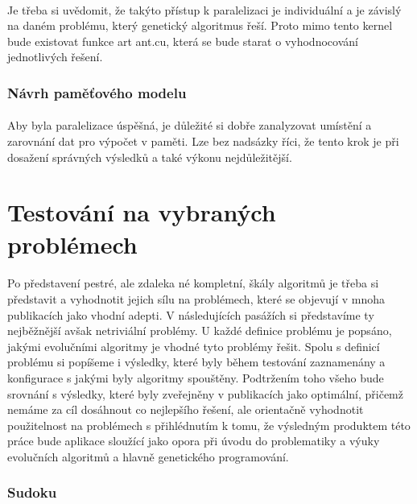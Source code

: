 \documentclass[bc,male,java,dept460]{diploma}		%
\begin{document}
\paragraph*{}
Je třeba si uvědomit, že takýto přístup k paralelizaci je individuální a je závislý na daném problému, který genetický algoritmus řeší. Proto mimo tento kernel bude existovat funkce art ant.cu, která se bude starat o vyhodnocování jednotlivých řešení.

\subsubsection{Návrh paměťového modelu}
\paragraph*{}
Aby byla paralelizace úspěšná, je důležité si dobře zanalyzovat umístění a zarovnání dat pro výpočet v paměti. Lze bez nadsázky říci, že tento krok je při dosažení správných výsledků a také výkonu nejdůležitější.



\section{Testování na vybraných problémech}
\paragraph*{}
Po představení pestré, ale zdaleka né kompletní, škály algoritmů je třeba si představit a vyhodnotit jejich sílu na problémech, které se objevují v mnoha publikacích jako vhodní adepti. V následujících pasážích si představíme ty nejběžnější avšak netriviální problémy. U každé definice problému je popsáno, jakými evolučními algoritmy je vhodné tyto problémy řešit. Spolu s definicí problému si popíšeme i výsledky, které byly během testování zaznamenány a konfigurace s jakými byly algoritmy spouštěny. Podtržením toho všeho bude srovnání s výsledky, které byly zveřejněny v publikacích jako optimální, přičemž nemáme za cíl dosáhnout co nejlepšího řešení, ale orientačně vyhodnotit použitelnost na problémech s přihlédnutím k tomu, že výsledným produktem této práce bude aplikace sloužící jako opora při úvodu do problematiky a výuky evolučních algoritmů a hlavně genetického programování.

\subsubsection{Sudoku}
\end{document}
